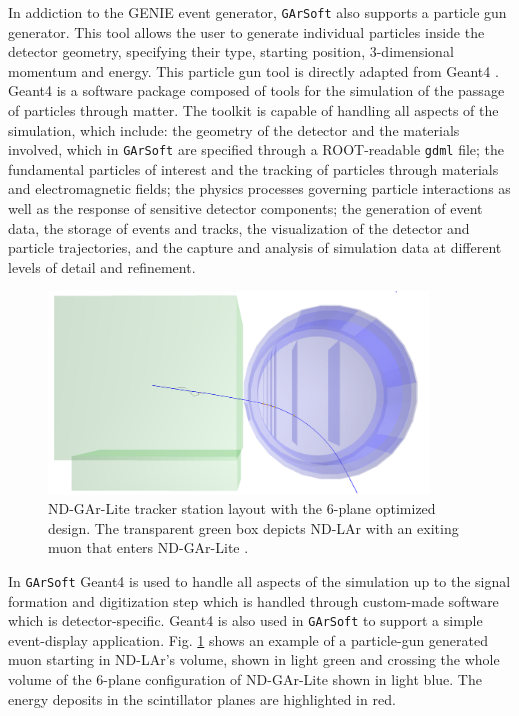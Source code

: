 In addiction to the GENIE event generator, \texttt{GArSoft} also supports a particle gun generator. This tool allows the user to generate individual particles inside the detector geometry, specifying their type, starting position, 3-dimensional momentum and energy. This particle gun tool is directly adapted from Geant4 \cite{GEANT4:2002zbu}. Geant4 is a software package composed of tools for the simulation of the passage of particles through matter. The toolkit is capable of handling all aspects of the simulation, which include: the geometry of the detector and the materials involved, which in \texttt{GArSoft} are specified through a ROOT-readable \texttt{gdml} file; the fundamental particles of interest and the tracking of particles through materials and electromagnetic fields; the physics processes governing particle interactions as well as the response of sensitive detector components; the generation of event data, the storage of events and tracks, the visualization of the detector and particle trajectories, and the capture and analysis of simulation data at different levels of detail and refinement. 
\begin{figure}[t]
     \centering
     \includegraphics[width=0.9\textwidth]{figures/ch4-KF_NDGArLite/Event_display.png}
     \caption{ND-GAr-Lite tracker station layout with the 6-plane optimized design. The transparent green box depicts ND-LAr with an exiting muon that enters ND-GAr-Lite \cite{ND-GAR-LiteCDR}.}
        \label{fig:EvtDisplayplane}
\end{figure}

In \texttt{GArSoft} Geant4 is used to handle all aspects of the simulation up to the signal formation and digitization step which is handled through custom-made software which is detector-specific. Geant4 is also used in \texttt{GArSoft} to support a simple event-display application. Fig. \ref{fig:EvtDisplayplane} shows an example of a particle-gun generated muon starting in ND-LAr's volume, shown in light green and crossing the whole volume of the 6-plane configuration of ND-GAr-Lite shown in light blue. The energy deposits in the scintillator planes are highlighted in red. 

